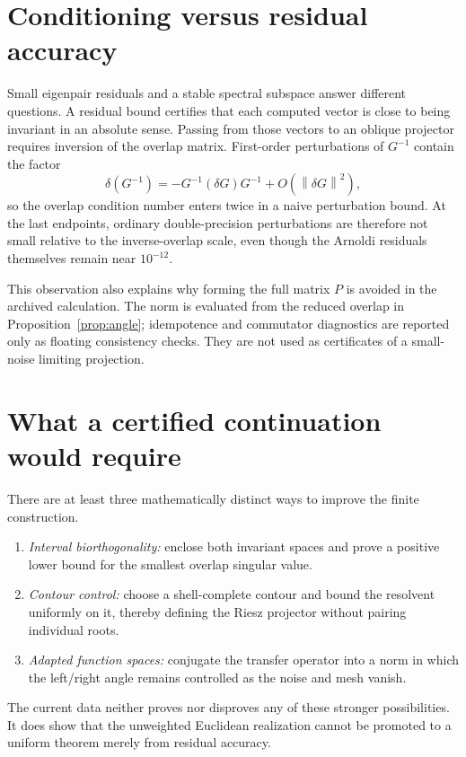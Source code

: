 \documentclass[11pt]{article}
\theoremstyle{remark}
\newcommand{\norm}[1]{\left\lVert#1\right\rVert}
\begin{document}
\section{Conditioning versus residual accuracy}

Small eigenpair residuals and a stable spectral subspace answer different
questions.  A residual bound certifies that each computed vector is close to
being invariant in an absolute sense.  Passing from those vectors to an
oblique projector requires inversion of the overlap matrix.  First-order
perturbations of $G^{-1}$ contain the factor
\[
 \delta(G^{-1})=-G^{-1}(\delta G)G^{-1}+O(\norm{\delta G}^2),
\]
so the overlap condition number enters twice in a naive perturbation bound.
At the last endpoints, ordinary double-precision perturbations are therefore
not small relative to the inverse-overlap scale, even though the Arnoldi
residuals themselves remain near $10^{-12}$.

This observation also explains why forming the full matrix $P$ is avoided in
the archived calculation.  The norm is evaluated from the reduced overlap
in Proposition~\ref{prop:angle}; idempotence and commutator diagnostics are
reported only as floating consistency checks.  They are not used as
certificates of a small-noise limiting projection.

\section{What a certified continuation would require}

There are at least three mathematically distinct ways to improve the finite
construction.
\begin{enumerate}[leftmargin=2em]
\item \emph{Interval biorthogonality:} enclose both invariant spaces and
prove a positive lower bound for the smallest overlap singular value.
\item \emph{Contour control:} choose a shell-complete contour and bound the
resolvent uniformly on it, thereby defining the Riesz projector without
pairing individual roots.
\item \emph{Adapted function spaces:} conjugate the transfer operator into a
norm in which the left/right angle remains controlled as the noise and mesh
vanish.
\end{enumerate}
The current data neither proves nor disproves any of these stronger
possibilities.  It does show that the unweighted Euclidean realization cannot
be promoted to a uniform theorem merely from residual accuracy.
\end{document}
